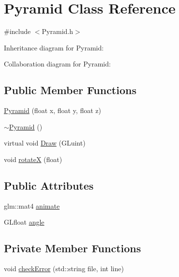 \hypertarget{class_pyramid}{}\section{Pyramid Class Reference}
\label{class_pyramid}


{\ttfamily \#include $<$Pyramid.\+h$>$}



Inheritance diagram for Pyramid\+:


Collaboration diagram for Pyramid\+:
\subsection*{Public Member Functions}
\begin{DoxyCompactItemize}
\item 
\hyperlink{class_pyramid_ac2fb5fcb7eeae3b952e3c097c7c9647b}{Pyramid} (float x, float y, float z)
\item 
\hyperlink{class_pyramid_a815ce650e2be7f04a44a0424af0e208a}{$\sim$\+Pyramid} ()
\item 
virtual void \hyperlink{class_pyramid_a4205e8fa45cc315d4687cf6c06182082}{Draw} (G\+Luint)
\item 
void \hyperlink{class_pyramid_aa1422dc7a204d2cf3ac9e28dae2d00cf}{rotate\+X} (float)
\end{DoxyCompactItemize}
\subsection*{Public Attributes}
\begin{DoxyCompactItemize}
\item 
glm\+::mat4 \hyperlink{class_pyramid_a8d8eb524eef28523e7203925a3aead87}{animate}
\item 
G\+Lfloat \hyperlink{class_pyramid_a719d723fa89279bae99e7c38603e91c2}{angle}
\end{DoxyCompactItemize}
\subsection*{Private Member Functions}
\begin{DoxyCompactItemize}
\item 
void \hyperlink{class_pyramid_abedc6115d45aa811ebe6b6d93fa87958}{check\+Error} (std\+::string file, int line)
\end{DoxyCompactItemize}
